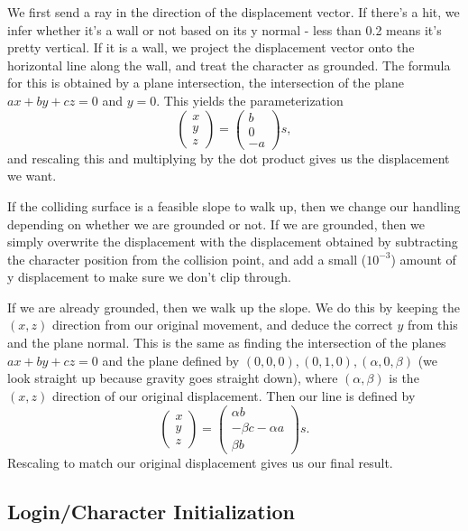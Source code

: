 \documentclass{article}
\begin{document}
We first send a ray in the direction of the displacement vector.
If there's a hit, we infer whether it's a wall or not based on its y normal -
less than 0.2 means it's pretty vertical. If it is a wall, we project the
displacement vector onto the horizontal line along the wall, and treat the character
as grounded.
The formula for this is obtained by a plane intersection, the intersection of the
plane $ax + by + cz = 0$ and $y = 0$. This yields the parameterization
\[
\begin{pmatrix}
    x\\
    y\\
    z 
\end{pmatrix} =
\begin{pmatrix}
    b\\0\\-a
\end{pmatrix}s,\]
and rescaling this and multiplying by the dot product gives us the displacement
we want.

If the colliding surface is a feasible slope to walk up, then we change
our handling depending on whether we are grounded or not. If we are grounded,
then we simply overwrite the displacement with the displacement obtained
by subtracting the character position from the collision point, and
add a small ($10^{-3}$) amount of y displacement to make sure we don't
clip through.

If we are already grounded, then we walk up the slope. We do this by keeping
the $(x, z)$ direction from our original movement, and deduce the correct
$y$ from this and the plane normal. This is the same as finding the
intersection of the planes $ax + by + cz = 0$ and the plane defined by
$(0, 0, 0), (0, 1, 0), (\alpha, 0, \beta)$ (we look straight up because gravity goes
straight down), where $(\alpha, \beta)$ is the $(x, z)$ direction of our
original displacement. Then our line is defined by
\[
\begin{pmatrix}
    x\\y\\z
\end{pmatrix} = 
\begin{pmatrix}
    \alpha b\\-\beta c - \alpha a\\\beta b
\end{pmatrix}s.\]
Rescaling to match our original displacement gives us our final result.

\subsection{Login/Character Initialization}
\end{document}
